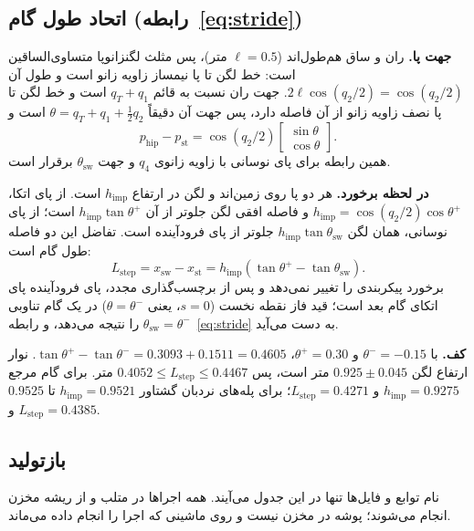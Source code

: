 \documentclass[10pt,twocolumn]{article}
\newcommand{\en}[1]{\lr{#1}}
\newcommand{\nd}{\lr{\textendash}}
\begin{document}
\subsection{اتحاد طول گام (رابطه~\eqref{eq:stride})}
\label{app:stride}
\textbf{جهت پا.} ران و ساق هم‌طول‌اند ($\ell=0.5$ متر)، پس مثلث لگن\nd{}زانو\nd{}پا
متساوی‌الساقین است: خط لگن تا پا نیمساز زاویه زانو است و طول آن
$2\ell\cos(q_2/2)=\cos(q_2/2)$. جهت ران نسبت به قائم $q_T+q_1$ است و خط لگن تا پا نصف زاویه
زانو از آن فاصله دارد، پس جهت آن دقیقاً $\theta=q_T+q_1+\tfrac12q_2$ است و
\begin{equation*}
    p_{\mathrm{hip}}-p_{\mathrm{st}}=\cos(q_2/2)\begin{bmatrix}\sin\theta\\ \cos\theta\end{bmatrix}.
\end{equation*}
همین رابطه برای پای نوسانی با زاویه زانوی $q_4$ و جهت $\theta_{\mathrm{sw}}$ برقرار است.

\textbf{در لحظه برخورد.} هر دو پا روی زمین‌اند و لگن در ارتفاع $h_{\mathrm{imp}}$ است. از
پای اتکا، $h_{\mathrm{imp}}=\cos(q_2/2)\cos\theta^+$ و فاصله افقی لگن جلوتر از آن
$h_{\mathrm{imp}}\tan\theta^+$ است؛ از پای نوسانی، همان لگن
$h_{\mathrm{imp}}\tan\theta_{\mathrm{sw}}$ جلوتر از پای فرودآینده است. تفاضل این دو فاصله طول
گام است:
\begin{equation*}
    L_{\mathrm{step}}=x_{\mathrm{sw}}-x_{\mathrm{st}}
    =h_{\mathrm{imp}}\left(\tan\theta^+-\tan\theta_{\mathrm{sw}}\right).
\end{equation*}
برخورد پیکربندی را تغییر نمی‌دهد و پس از برچسب‌گذاری مجدد، پای فرودآینده پای اتکای گام بعد
است؛ قید فاز نقطه نخست ($s=0$، یعنی $\theta=\theta^-$) در یک گام تناوبی $\theta_{\mathrm{sw}}=\theta^-$
را نتیجه می‌دهد، و رابطه~\eqref{eq:stride} به دست می‌آید.

\textbf{کف.} با $\theta^-=-0.15$ و $\theta^+=0.30$،
$\tan\theta^+-\tan\theta^-=0.3093+0.1511=0.4605$. نوار ارتفاع لگن
$0.925\pm0.045$ متر است، پس $0.4052\le L_{\mathrm{step}}\le0.4467$ متر. برای گام مرجع
$h_{\mathrm{imp}}=0.9275$ و $L_{\mathrm{step}}=0.4271$؛ برای پله‌های نردبان گشتاور
$h_{\mathrm{imp}}=0.9521$ تا $0.9525$ و $L_{\mathrm{step}}=0.4385$.

\subsection{بازتولید}
\label{app:repro}
نام توابع و فایل‌ها تنها در این جدول می‌آیند. همه اجراها در متلب و از ریشه مخزن انجام
می‌شوند؛ پوشه \en{Results/} در مخزن نیست و روی ماشینی که اجرا را انجام داده می‌ماند.
\end{document}
